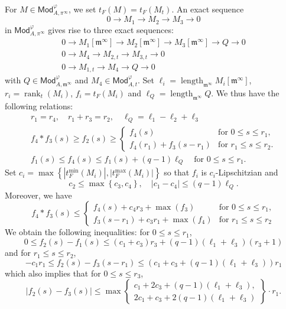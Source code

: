 \documentclass[11pt]{article}
\theoremstyle{definition}
\numberwithin{equation}{section}
\numberwithin{figure}{section}
\numberwithin{table}{section}
\newcommand{\Mod}{\mathsf{Mod}}
\DeclareMathOperator{\length}{length}
\DeclareMathOperator{\rank}{rank}
\begin{document}
\subsubsection{}\label{subsec:ExactSeqInModpi}

For $M\in\Mod_{A,\pi^{\infty}}^{\varphi}$, we set $t_{F}(M)=t_{F}(M_{t})$. An exact sequence
\[
0\rightarrow M_{1}\rightarrow M_{2}\rightarrow M_{3}\rightarrow0
\]
in $\Mod_{A,\pi^{\infty}}^{\varphi}$ gives rise to three exact sequences:
\begin{gather*}
0\rightarrow M_{1}[\mathfrak{m}^{\infty}]\rightarrow M_{2}[\mathfrak{m}^{\infty}]\rightarrow M_{3}[\mathfrak{m}^{\infty}]\rightarrow Q\rightarrow0
\\
0\rightarrow M_{4}\rightarrow M_{2,t}\rightarrow M_{3,t}\rightarrow0
\\
0\rightarrow M_{1,t}\rightarrow M_{4}\rightarrow Q\rightarrow0
\end{gather*}
with $Q\in\Mod_{A,\mathfrak{m}^{\infty}}^{\varphi}$ and $M_{4}\in\Mod_{A,t}^{\varphi}$. Set $\ell_{i}=\length_{\mathfrak{m}^{\infty}}M_{i}[\mathfrak{m}^{\infty}]$, $r_{i}=\rank_{t}(M_{i})$, $f_{i}=t_{F}(M_{i})$ and $\ell_{Q}=\length_{\mathfrak{m}^{\infty}}Q$. We thus have the following relations:
\begin{gather*}
r_{1}=r_{4},\quad r_{1}+r_{3}=r_{2},\quad\ell_{Q}=\ell_{1}-\ell_{2}+\ell_{3}
\\
f_{4}\ast f_{3}(s)\geq f_{2}(s)\geq
\begin{cases}
f_{4}(s) & \text{for }0\leq s\leq r_{1},\\
f_{4}(r_{1})+f_{3}(s-r_{1}) & \text{for }r_{1}\leq s\leq r_{2}.
\end{cases}
\\
f_{1}(s)\leq f_{4}(s)\leq f_{1}(s)+(q-1)\ell_{Q}\quad\text{for }0\leq s\leq r_{1}.
\end{gather*}
Set $c_{i}=\max\left\{
\left|t_{F}^{\min}(M_{i})\right|,\left|t_{F}^{\max}(M_{i})\right|\right\} $ so that $f_{i}$ is $c_{i}$-Lipschitzian and
\[
c_{2}\leq\max\left\{ c_{3},c_{4}\right\},\quad\left|c_{1}-c_{4}\right|\leq(q-1)\ell_{Q}.
\]
Moreover, we have
\[
f_{4}\ast f_{3}(s)\leq
\begin{cases}
f_{4}(s)+c_{4}r_{3}+\max(f_{3}) & \text{for }0\leq s\leq r_{1},\\
f_{3}(s-r_{1})+c_{3}r_{1}+\max(f_{4}) & \text{for }r_{1}\leq s\leq r_{2}
\end{cases}
\]
We obtain the following inequalities: for $0\leq s\leq r_{1}$,
\[
0\le f_{2}(s)-f_{1}(s)\leq\left(c_{1}+c_{3}\right)r_{3}+(q-1)(\ell_{1}+\ell_{3})(r_{3}+1)
\]
and for $r_{1}\leq s\leq r_{2}$,
\[
-c_{1}r_{1}\leq f_{2}(s)-f_{3}(s-r_{1})\leq\left(c_{1}+c_{3}+(q-1)(\ell_{1}+\ell_{3})\right)r_{1}
\]
which also implies that for $0\leq s\leq r_{3}$,
\[
\left|f_{2}(s)-f_{3}(s)\right|\leq\max\left\{\!
\begin{array}{c}
c_{1}+2c_{3}+(q-1)(\ell_{1}+\ell_{3}),\\
2c_{1}+c_{3}+2(q-1)(\ell_{1}+\ell_{3})
\end{array}\!\right\} \cdot r_{1}.
\]
\end{document}
